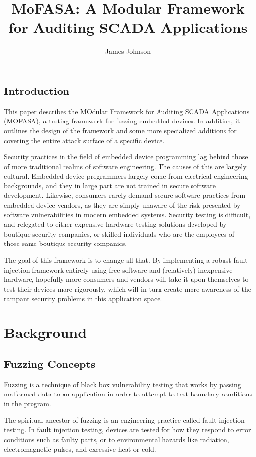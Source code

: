 \documentclass{report}
\title{MoFASA: A Modular Framework for Auditing SCADA Applications}
\author{James Johnson}
\date{}
\begin{document}
\maketitle
\section*{Introduction}
This paper describes the MOdular Framework for Auditing SCADA Applications (MOFASA), a testing framework for
fuzzing embedded devices. In addition, it outlines the design of the framework and some more specialized
additions for covering the entire attack surface of a specific device.

Security practices in the field of embedded device programming lag behind those of more traditional realms
of software engineering. The causes of this are largely cultural. Embedded device programmers largely come
from electrical engineering backgrounds, and they in large part are not trained in secure software development.
Likewise, consumers rarely demand secure software practices from embedded device vendors, as they are simply
unaware of the risk presented by software vulnerabilities in modern embedded systems. Security testing is difficult,
and relegated to either expensive hardware testing solutions developed by boutique security companies, or skilled
individuals who are the employees of those same boutique security companies.

The goal of this framework is to change all that. By implementing a robust fault injection framework entirely
using free software and (relatively) inexpensive hardware, hopefully more consumers and vendors will take it
upon themselves to test their devices more rigorously, which will in turn create more awareness of the rampant
security problems in this application space.

\chapter{Background}
\section{Fuzzing Concepts}
Fuzzing is a technique of black box vulnerability testing that works by passing malformed data to an application
in order to attempt to test boundary conditions in the program.

The spiritual ancestor of fuzzing is an engineering practice called fault injection testing. In fault injection testing,
devices are tested for how they respond to error conditions such as faulty parts, or to environmental hazards like radiation,
electromagnetic pulses, and excessive heat or cold.
\end{document}
